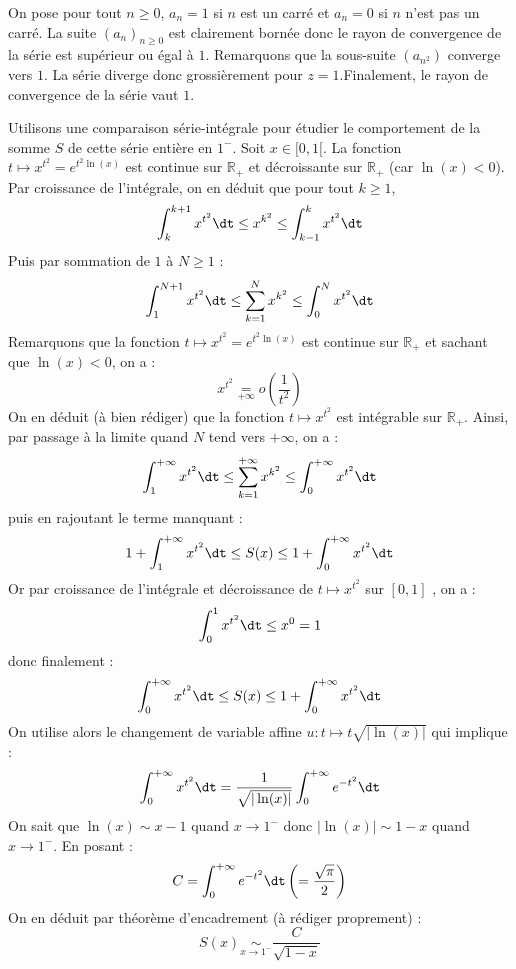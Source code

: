 \documentclass[a4paper,10pt]{report}
\begin{document}
\begin{corr} On pose pour tout $n \geq 0$, $a_n=1$ si $n$ est un carré et $a_n =0$ si $n$ n'est pas un carré. La suite $(a_n)_{n \geq 0}$ est clairement bornée donc le rayon de convergence de la série est supérieur ou égal à $1$. Remarquons que la sous-suite $(a_{n^2})$ converge vers $1$. La série diverge donc grossièrement pour $z=1$.Finalement, le rayon de convergence de la série vaut $1$.


\medskip

\noindent Utilisons une comparaison série-intégrale pour étudier le comportement de la somme $S$ de cette série entière en $1^{-}$. Soit $x \in [0,1[$. La fonction $t \mapsto x^{t^2} = e^{t^2 \ln(x)}$ est continue sur $\mathbb{R}_+$ et décroissante sur $\mathbb{R}_+$ (car $\ln(x)<0$). Par croissance de l'intégrale, on en déduit que pour tout $k \geq 1$,
$$ \int_{k}^{k+1} x^{t^2} \dt \leq x^{k^2} \leq \int_{k-1}^{k} x^{t^2} \dt$$
Puis par sommation de $1$ à $N \geq 1$ :
$$ \int_{1}^{N+1} x^{t^2} \dt \leq \sum_{k=1}^N x^{k^2} \leq \int_{0}^{N} x^{t^2} \dt$$
Remarquons que la fonction $t \mapsto x^{t^2} = e^{t^2 \ln(x)}$ est continue sur $\mathbb{R}_+$ et sachant que $\ln(x)<0$, on a :
$$ x^{t^2} \underset{+ \infty}{=} o \left( \dfrac{1}{t^2} \right)$$
On en déduit (à bien rédiger) que la fonction $t \mapsto x^{t^2}$ est intégrable sur $\mathbb{R}_+$. Ainsi, par passage à la limite quand $N$ tend vers $+ \infty$, on a :
$$  \int_{1}^{+ \infty} x^{t^2} \dt \leq \sum_{k=1}^{+ \infty} x^{k^2} \leq \int_{0}^{+ \infty} x^{t^2} \dt$$
puis en rajoutant le terme manquant :
$$ 1+  \int_{1}^{+ \infty} x^{t^2} \dt \leq S(x) \leq 1+ \int_{0}^{+ \infty} x^{t^2} \dt$$
Or par croissance de l'intégrale et décroissance de $t \mapsto x^{t^2}$ sur $[0,1]$ , on a :
$$ \int_{0}^{1} x^{t^2} \dt \leq x^{0} =1$$
donc finalement :
$$\int_{0}^{+ \infty} x^{t^2} \dt \leq S(x) \leq 1+ \int_{0}^{+ \infty} x^{t^2} \dt$$
On utilise alors le changement de variable affine  $u : t \mapsto t \sqrt{\vert \ln(x) \vert}$ qui implique :
$$ \int_{0}^{+ \infty} x^{t^2} \dt = \dfrac{1}{\sqrt{\vert \ln(x) \vert}} \int_{0}^{+ \infty} e^{-t^2} \dt$$
On sait que $\ln(x) \sim x-1$ quand $x \rightarrow 1^{-}$ donc $\vert \ln(x) \vert \sim 1-x$ quand $x \rightarrow 1^{-}$. En posant :
$$ C =  \int_{0}^{+ \infty} e^{-t^2} \dt \left( = \dfrac{\sqrt{\pi}}{2} \right)$$
On en déduit par théorème d'encadrement (à rédiger proprement) :
$$S(x) \underset{x \rightarrow 1^{-}}{\sim} \dfrac{C}{\sqrt{1-x}}$$
\end{corr}
\end{document}
